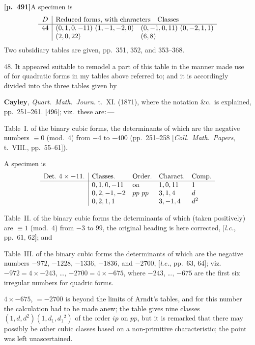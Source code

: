 \documentclass[11pt,a4paper]{article}
\begin{document}
\noindent\textbf{[p.~491]}\quad A specimen is
\[
\begin{array}{c|ll}
D & \multicolumn{2}{l}{\text{Reduced forms, with characters}\quad\text{Classes}} \\
\hline
44 & (0, 1, 0, -11)\ (1, -1, -2, 0) & (0, -1, 0, 11)\ (0, -2, 1, 1) \\
 & (2, 0, 22) & (6, 8)
\end{array}
\]
Two subsidiary tables are given, pp.~351, 352, and 353--368.

48. It appeared suitable to remodel a part of this table in the manner made use of for quadratic forms in my tables above referred to; and it is accordingly divided into the three tables given by

\textbf{Cayley}, \textit{Quart.\ Math.\ Journ.} t.~XI. (1871), where the notation \&c.\ is explained, pp.~251--261. [496]; viz.\ these are:\,---

Table~I. of the binary cubic forms, the determinants of which are the negative numbers $\equiv 0$ (mod.~$4$) from $-4$ to $-400$ (pp.~251--258 [\textit{Coll.\ Math.\ Papers}, t.~VIII., pp.~55--61]).

A specimen is
\[
\begin{array}{c|llll}
\text{Det.\ } 4 \times -11. & \text{Classes.} & \text{Order.} & \text{Charact.} & \text{Comp.} \\
\hline
 & 0, 1, 0, -11 & \text{on} & 1, 0, 11 & 1 \\
 & 0, 2, -1, -2 & pp\ pp & 3, 1, 4 & d \\
 & 0, 2, 1, 1 &  & 3, -1, 4 & d^{2}
\end{array}
\]

Table~II. of the binary cubic forms the determinants of which (taken positively) are $\equiv 1$ (mod.~$4$) from $-3$ to $99$, the original heading is here corrected, [\textit{l.c.}, pp.~61, 62]; and

Table~III. of the binary cubic forms the determinants of which are the negative numbers $-972$, $-1228$, $-1336$, $-1836$, and $-2700$, [\textit{l.c.}, pp.~63, 64]; viz.\ $-972 = 4 \times -243$, \ldots, $-2700 = 4 \times -675$, where $-243$, \ldots, $-675$ are the first six irregular numbers for quadric forms.

$4 \times -675$, $= -2700$ is beyond the limits of Arndt's tables, and for this number the calculation had to be made anew; the table gives nine classes $(1, d, d^{2})(1, d_{1}, d_{1}{}^{2})$ of the order $ip$ on $pp$, but it is remarked that there may possibly be other cubic classes based on a non-primitive characteristic; the point was left unascertained.
\end{document}
